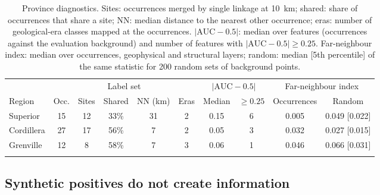 \documentclass[pdflatex,sn-apa]{sn-jnl}
\begin{document}
\begin{table}[t]
\caption{Province diagnostics. Sites: occurrences merged by single linkage at 10~km; shared: share of occurrences that share a site; NN: median distance to the nearest other occurrence; eras: number of geological-era classes mapped at the occurrences. $|\mathrm{AUC}-0.5|$: median over features (occurrences against the evaluation background) and number of features with $|\mathrm{AUC}-0.5| \geq 0.25$. Far-neighbour index: median over occurrences, geophysical and structural layers; random: median [5th percentile] of the same statistic for 200 random sets of background points.}\label{tab:region-diag}
\scriptsize
\setlength{\tabcolsep}{2.5pt}
\begin{tabular*}{\textwidth}{@{\extracolsep\fill}lccccccccc}
\toprule
 & \multicolumn{5}{c}{Label set} & \multicolumn{2}{c}{$|\mathrm{AUC}-0.5|$} & \multicolumn{2}{c}{Far-neighbour index} \\
\cmidrule(lr){2-6}\cmidrule(lr){7-8}\cmidrule(lr){9-10}
Region & Occ. & Sites & Shared & NN (km) & Eras & Median & $\geq 0.25$ & Occurrences & Random \\
\midrule
Superior & 15 & 12 & 33\% & 31 & 2 & 0.15 & 6 & 0.005 & 0.049 [0.022] \\
Cordillera & 27 & 17 & 56\% & 7 & 2 & 0.05 & 3 & 0.032 & 0.027 [0.015] \\
Grenville & 12 & 8 & 58\% & 7 & 3 & 0.06 & 1 & 0.046 & 0.066 [0.031] \\
\botrule
\end{tabular*}
\end{table}

\subsection{Synthetic positives do not create information}\label{sec:disc-gan}
\end{document}
